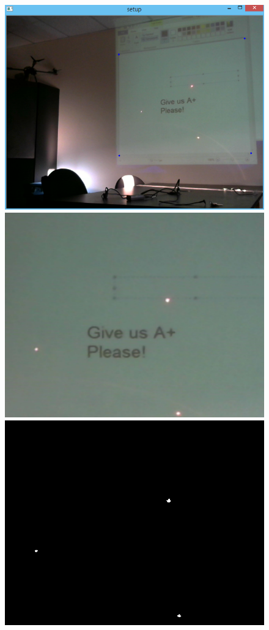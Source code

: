 \documentclass[a4paper]{article}
\begin{document}
\begin{figure}
	\includegraphics[width=\linewidth]{raw_feed.png} \newline
	\includegraphics[width=\linewidth]{transformed.png} \newline
	\includegraphics[width=\linewidth]{bwimage.png}

\end{figure}
\end{document}
